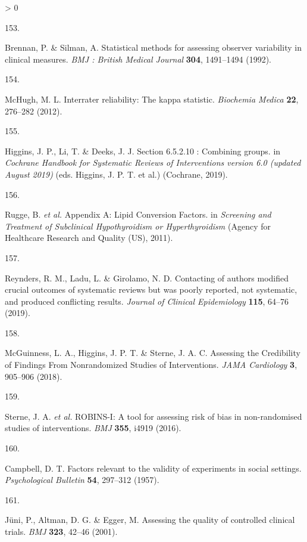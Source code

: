 \documentclass[a4paper, twoside]{templates/ociamthesis}
\newlength{\cslhangindent}
\newlength{\csllabelwidth}
\newenvironment{CSLReferences}[3] %
 {%
  \setlength{\parindent}{0pt}
  \ifodd #1 \everypar{\setlength{\hangindent}{\cslhangindent}}\ignorespaces\fi
  \ifnum #2 > 0
  \setlength{\parskip}{#2\baselineskip}
  \fi
 }%
 {}
\newcommand{\CSLLeftMargin}[1]{\parbox[t]{\maxof{\widthof{#1}}{\csllabelwidth}}{#1}}
\newcommand{\CSLRightInline}[1]{\parbox[t]{\linewidth - \csllabelwidth}{#1}}
\begin{document}
\begin{CSLReferences}{0}{0}
\leavevmode\hypertarget{ref-brennan1992}{}%
\CSLLeftMargin{153. }
\CSLRightInline{Brennan, P. \& Silman, A. Statistical methods for assessing observer variability in clinical measures. \emph{BMJ : British Medical Journal} \textbf{304}, 1491--1494 (1992).}

\leavevmode\hypertarget{ref-mchugh2012}{}%
\CSLLeftMargin{154. }
\CSLRightInline{McHugh, M. L. Interrater reliability: The kappa statistic. \emph{Biochemia Medica} \textbf{22}, 276--282 (2012).}

\leavevmode\hypertarget{ref-higgins2019}{}%
\CSLLeftMargin{155. }
\CSLRightInline{Higgins, J. P., Li, T. \& Deeks, J. J. Section 6.5.2.10 : Combining groups. in \emph{Cochrane {Handbook} for {Systematic Reviews} of {Interventions} version 6.0 (updated {August} 2019)} (eds. Higgins, J. P. T. et al.) ({Cochrane}, 2019).}

\leavevmode\hypertarget{ref-rugge2011}{}%
\CSLLeftMargin{156. }
\CSLRightInline{Rugge, B. \emph{et al.} Appendix {A}: Lipid {Conversion Factors}. in \emph{Screening and {Treatment} of {Subclinical Hypothyroidism} or {Hyperthyroidism}} ({Agency for Healthcare Research and Quality (US)}, 2011).}

\leavevmode\hypertarget{ref-reynders2019}{}%
\CSLLeftMargin{157. }
\CSLRightInline{Reynders, R. M., Ladu, L. \& Girolamo, N. D. Contacting of authors modified crucial outcomes of systematic reviews but was poorly reported, not systematic, and produced conflicting results. \emph{Journal of Clinical Epidemiology} \textbf{115}, 64--76 (2019).}

\leavevmode\hypertarget{ref-mcguinness2018}{}%
\CSLLeftMargin{158. }
\CSLRightInline{McGuinness, L. A., Higgins, J. P. T. \& Sterne, J. A. C. Assessing the {Credibility} of {Findings From Nonrandomized Studies} of {Interventions}. \emph{JAMA Cardiology} \textbf{3}, 905--906 (2018).}

\leavevmode\hypertarget{ref-sterne2016}{}%
\CSLLeftMargin{159. }
\CSLRightInline{Sterne, J. A. \emph{et al.} {ROBINS}-{I}: A tool for assessing risk of bias in non-randomised studies of interventions. \emph{BMJ} \textbf{355}, i4919 (2016).}

\leavevmode\hypertarget{ref-campbell1957}{}%
\CSLLeftMargin{160. }
\CSLRightInline{Campbell, D. T. Factors relevant to the validity of experiments in social settings. \emph{Psychological Bulletin} \textbf{54}, 297--312 (1957).}

\leavevmode\hypertarget{ref-juni2001}{}%
\CSLLeftMargin{161. }
\CSLRightInline{Jüni, P., Altman, D. G. \& Egger, M. Assessing the quality of controlled clinical trials. \emph{BMJ} \textbf{323}, 42--46 (2001).}


\end{CSLReferences}
\end{document}
